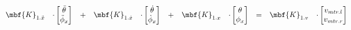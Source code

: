\documentclass[crop=false,float=true,class=scrreprt]{standalone}
\begin{document}
\begin{equation}
\label{EQN:hwePlantDynamicsModel:stateSpaceRepresentation1}
\begin{array}{ccccccccccc}
\mbf{K}_{1.\ddot{x}}
& \cdot 
\begin{bmatrix}
\ddot{\theta}  \\
\ddot{\phi}_{x}\\
\end{bmatrix}
& + &
\mbf{K}_{1.\dot{x}}
& \cdot 
\begin{bmatrix}
\dot{\theta}  \\
\dot{\phi}_{x}\\
\end{bmatrix}
& + &
\mbf{K}_{1.x}
& \cdot 
\begin{bmatrix}
\theta  \\
\phi_{x}\\
\end{bmatrix}
& = &
\mbf{K}_{1.v}
& \cdot
\begin{bmatrix}
v_{mtr.l}\\
v_{mtr.r}\\
\end{bmatrix}
\\[+2em]


\end{array}
\end{equation}
\end{document}
